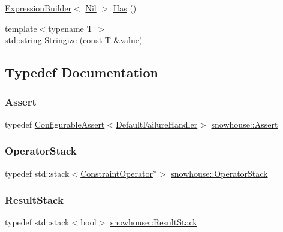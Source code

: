 \begin{DoxyCompactItemize}
\item 
\mbox{\hyperlink{structsnowhouse_1_1ExpressionBuilder}{Expression\+Builder}}$<$ \mbox{\hyperlink{structsnowhouse_1_1Nil}{Nil}} $>$ \mbox{\hyperlink{namespacesnowhouse_a6611d88e19c4a79418f43de9647cbbb7}{Has}} ()
\item 
{\footnotesize template$<$typename T $>$ }\\std\+::string \mbox{\hyperlink{namespacesnowhouse_a554db10d0db5b9347e3f9f05f2981beb}{Stringize}} (const T \&value)
\end{DoxyCompactItemize}


\subsection{Typedef Documentation}
\mbox{\label{namespacesnowhouse_a973f131b742877a7484a9bf8e1768515}} 
\subsubsection{\texorpdfstring{Assert}{Assert}}
{\footnotesize\ttfamily typedef \mbox{\hyperlink{structsnowhouse_1_1ConfigurableAssert}{Configurable\+Assert}}$<$\mbox{\hyperlink{structsnowhouse_1_1DefaultFailureHandler}{Default\+Failure\+Handler}}$>$ \mbox{\hyperlink{namespacesnowhouse_a973f131b742877a7484a9bf8e1768515}{snowhouse\+::\+Assert}}}

\mbox{\label{namespacesnowhouse_adcb10e215e6a4bbcb35722a9c7270fc6}} 
\subsubsection{\texorpdfstring{OperatorStack}{OperatorStack}}
{\footnotesize\ttfamily typedef std\+::stack$<$\mbox{\hyperlink{structsnowhouse_1_1ConstraintOperator}{Constraint\+Operator}}$\ast$$>$ \mbox{\hyperlink{namespacesnowhouse_adcb10e215e6a4bbcb35722a9c7270fc6}{snowhouse\+::\+Operator\+Stack}}}

\mbox{\label{namespacesnowhouse_a719169b1315a13161c15f25e600a8f51}} 
\subsubsection{\texorpdfstring{ResultStack}{ResultStack}}
{\footnotesize\ttfamily typedef std\+::stack$<$bool$>$ \mbox{\hyperlink{namespacesnowhouse_a719169b1315a13161c15f25e600a8f51}{snowhouse\+::\+Result\+Stack}}}



